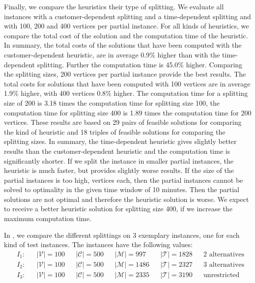 Finally, we compare the heuristics \wrt their type of splitting. We evaluate all instances with a customer-dependent splitting and a time-dependent splitting and with 100, 200 and 400 vertices per partial instance. For all kinds of heuristics, we compare the total cost of the solution and the computation time of the heuristic. In summary, the total costs of the solutions that have been computed with the customer-dependent heuristic, are in average 0.9\% higher than with the time-dependent splitting. Further the computation time is 45.0\% higher. Comparing the splitting sizes, 200 vertices per partial instance provide the best results. The total costs for solutions that have been computed with 100 vertices are in average 1.9\% higher, with 400 vertices 0.8\% higher. The computation time for a splitting size of 200 is 3.18 times the computation time for splitting size 100, the computation time for splitting size 400 is 1.89 times the computation time for 200 vertices. These results are based on 29 pairs of feasible solutions for comparing the kind of heuristic and 18 triples of feasible solutions for comparing the splitting sizes. In summary, the time-dependent heuristic gives slightly better results than the customer-dependent heuristic and the computation time is significantly shorter. If we split the instance in smaller partial instances, the heuristic is much faster, but provides slightly worse results. If the size of the partial instances is too high,  vertices each, then the partial instances cannot be solved to optimality in the given time window of 10 minutes. Then the partial solutions are not optimal and therefore the heuristic solution is worse. We expect to receive a better heuristic solution for splitting size 400, if we increase the maximum computation time. 

In , we compare the different splittings on 3 exemplary instances, one for each kind of test instances. The instances have the following values:
\begin{align*}
	& I_1: && \vert\mathcal{V}\vert = 100 && \vert\mathcal{C}\vert = 500 && \vert\mathcal{M}\vert = 997 && \vert\mathcal{T}\vert = 1828 && 2 \text{ alternatives} \\
	& I_2: && \vert\mathcal{V}\vert = 100 && \vert\mathcal{C}\vert = 500 && \vert\mathcal{M}\vert = 1486 && \vert\mathcal{T}\vert = 2327 && 3 \text{ alternatives} \\
	& I_3: && \vert\mathcal{V}\vert = 100 && \vert\mathcal{C}\vert = 500 && \vert\mathcal{M}\vert = 2335 && \vert\mathcal{T}\vert = 3190 && \text{unrestricted} \\
\end{align*}


